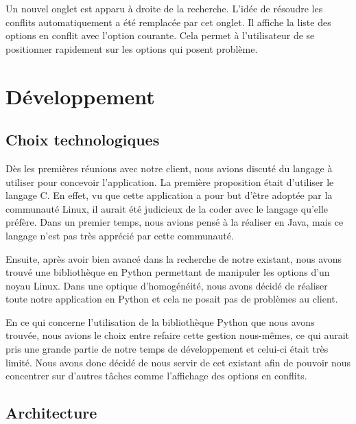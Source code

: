 \documentclass[16pts]{report}
\begin{document}
\begin{enumerate}
	Un nouvel onglet est apparu à droite de la recherche. L'idée de résoudre 
	les conflits automatiquement a été remplacée par cet onglet. Il affiche 
	la liste des options en conflit avec l'option courante. Cela permet à 
	l'utilisateur de se positionner rapidement sur les options qui posent 
	problème. 
	\\
\end{enumerate}


\chapter{Développement}
\label{cha:Développement}
    \section{Choix technologiques}
    \label{sub:Choix technologiques}

Dès les premières réunions avec notre client, nous avions discuté du langage à 
utiliser pour concevoir l'application. La première proposition était d'utiliser 
le langage C. En effet, vu que cette application a pour but d'être adoptée par 
la communauté Linux, il aurait été judicieux de la coder avec le langage 
qu'elle préfère. Dans un premier temps, nous avions pensé à la réaliser
en Java, mais ce langage n'est pas très apprécié par cette communauté.

Ensuite, après avoir bien avancé dans la recherche de notre existant, nous 
avons trouvé une bibliothèque en Python permettant de manipuler les options 
d'un noyau Linux. Dans une optique d'homogénéité, nous avons décidé de réaliser 
toute notre application en Python et cela ne posait pas de problèmes au client.

En ce qui concerne l'utilisation de la bibliothèque Python que nous avons 
trouvée, nous avions le choix entre refaire cette gestion nous-mêmes, ce qui 
aurait pris une grande partie de notre temps de développement et celui-ci 
était très limité. Nous avons donc décidé de nous servir de cet existant 
afin de pouvoir nous concentrer sur d'autres tâches comme l'affichage 
des options en conflits.


    \section{Architecture}
    \label{sub:Architecture}
\end{document}
